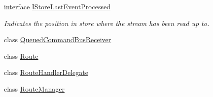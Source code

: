 \begin{DoxyCompactItemize}
interface \hyperlink{interfaceCqrs_1_1Bus_1_1IStoreLastEventProcessed}{I\+Store\+Last\+Event\+Processed}
\begin{DoxyCompactList}\small\item\em Indicates the position in store where the stream has been read up to. \end{DoxyCompactList}\item 
class \hyperlink{classCqrs_1_1Bus_1_1QueuedCommandBusReceiver}{Queued\+Command\+Bus\+Receiver}
\item 
class \hyperlink{classCqrs_1_1Bus_1_1Route}{Route}
\item 
class \hyperlink{classCqrs_1_1Bus_1_1RouteHandlerDelegate}{Route\+Handler\+Delegate}
\item 
class \hyperlink{classCqrs_1_1Bus_1_1RouteManager}{Route\+Manager}
\end{DoxyCompactItemize}

